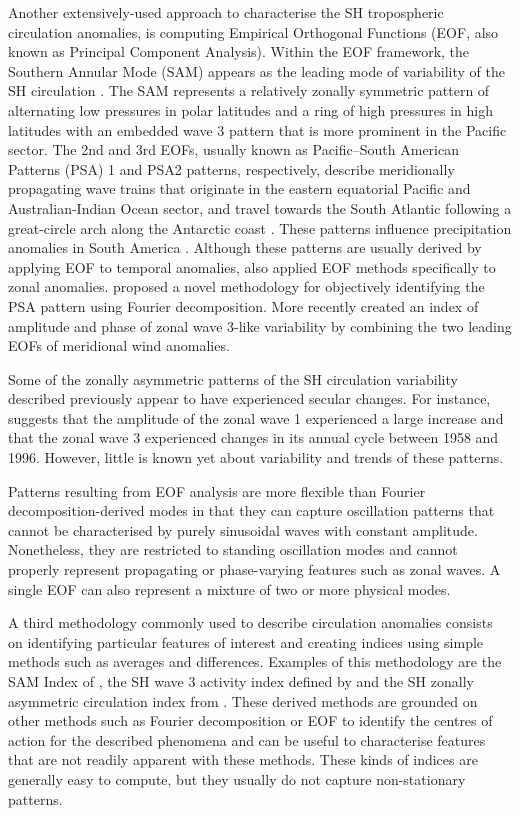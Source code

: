 \documentclass[pdflatex,lineno,sn-basic]{sn-jnl}
\theoremstyle{thmstyleone}%
\theoremstyle{thmstyletwo}%
\theoremstyle{thmstylethree}%
\begin{document}
Another extensively-used approach to characterise the SH tropospheric circulation anomalies, is computing Empirical Orthogonal Functions (EOF, also known as Principal Component Analysis).
Within the EOF framework, the Southern Annular Mode (SAM) appears as the leading mode of variability of the SH circulation \citep{fogt2020}.
The SAM represents a relatively zonally symmetric pattern of alternating low pressures in polar latitudes and a ring of high pressures in high latitudes with an embedded wave 3 pattern that is more prominent in the Pacific sector.
The 2nd and 3rd EOFs, usually known as Pacific--South American Patterns (PSA) 1 and PSA2 patterns, respectively, describe meridionally propagating wave trains that originate in the eastern equatorial Pacific and Australian-Indian Ocean sector, and travel towards the South Atlantic following a great-circle arch along the Antarctic coast \citep{mo2001}.
These patterns influence precipitation anomalies in South America \citep{mo2001}.
Although these patterns are usually derived by applying EOF to temporal anomalies, \citet{raphael2003} also applied EOF methods specifically to zonal anomalies.
\citet{irving2016} proposed a novel methodology for objectively identifying the PSA pattern using Fourier decomposition.
More recently \citet{goyal2022} created an index of amplitude and phase of zonal wave 3-like variability by combining the two leading EOFs of meridional wind anomalies.

Some of the zonally asymmetric patterns of the SH circulation variability described previously appear to have experienced secular changes.
For instance, \citet{raphael2003} suggests that the amplitude of the zonal wave 1 experienced a large increase and that the zonal wave 3 experienced changes in its annual cycle between 1958 and 1996.
However, little is known yet about variability and trends of these patterns.

Patterns resulting from EOF analysis are more flexible than Fourier decomposition-derived modes in that they can capture oscillation patterns that cannot be characterised by purely sinusoidal waves with constant amplitude.
Nonetheless, they are restricted to standing oscillation modes and cannot properly represent propagating or phase-varying features such as zonal waves.
A single EOF can also represent a mixture of two or more physical modes.

A third methodology commonly used to describe circulation anomalies consists on identifying particular features of interest and creating indices using simple methods such as averages and differences.
Examples of this methodology are the SAM Index of \citet{gong1999}, the SH wave 3 activity index defined by \citet{raphael2004} and the SH zonally asymmetric circulation index from \citet{hobbs2010}.
These derived methods are grounded on other methods such as Fourier decomposition or EOF to identify the centres of action for the described phenomena and can be useful to characterise features that are not readily apparent with these methods.
These kinds of indices are generally easy to compute, but they usually do not capture non-stationary patterns.
\end{document}
